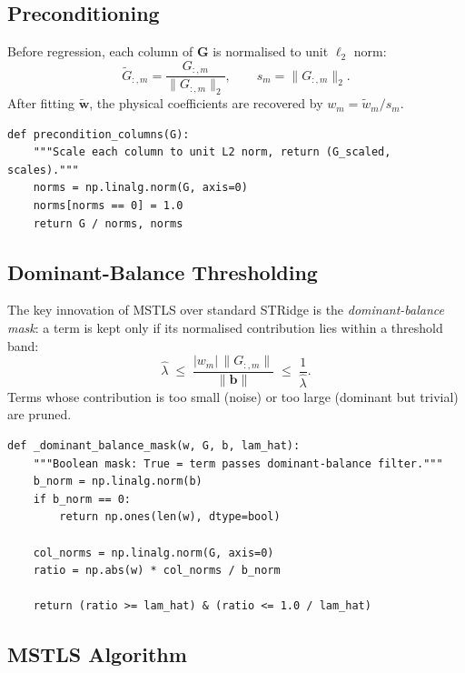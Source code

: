 \documentclass[11pt]{article}
\begin{document}
\subsection{Preconditioning}

Before regression, each column of $\mathbf{G}$ is normalised to unit
$\ell_2$ norm:
\begin{equation}
  \tilde{G}_{:,m} = \frac{G_{:,m}}{\|G_{:,m}\|_2},
  \qquad
  s_m = \|G_{:,m}\|_2.
\end{equation}
After fitting $\tilde{\mathbf{w}}$, the physical coefficients are
recovered by $w_m = \tilde{w}_m / s_m$.

\begin{lstlisting}[caption={regression.py --- Column preconditioning}]
def precondition_columns(G):
    """Scale each column to unit L2 norm, return (G_scaled, scales)."""
    norms = np.linalg.norm(G, axis=0)
    norms[norms == 0] = 1.0
    return G / norms, norms
\end{lstlisting}


\subsection{Dominant-Balance Thresholding}

The key innovation of MSTLS over standard STRidge is the
\emph{dominant-balance mask}: a term is kept only if its normalised
contribution lies within a threshold band:
\begin{equation}\label{eq:dominant_balance}
  \hat{\lambda} \;\le\;
  \frac{|w_m|\,\|G_{:,m}\|}{\|\mathbf{b}\|}
  \;\le\; \frac{1}{\hat{\lambda}}.
\end{equation}
Terms whose contribution is too small (noise) or too large (dominant
but trivial) are pruned.

\begin{lstlisting}[caption={regression.py --- Dominant-balance mask}]
def _dominant_balance_mask(w, G, b, lam_hat):
    """Boolean mask: True = term passes dominant-balance filter."""
    b_norm = np.linalg.norm(b)
    if b_norm == 0:
        return np.ones(len(w), dtype=bool)

    col_norms = np.linalg.norm(G, axis=0)
    ratio = np.abs(w) * col_norms / b_norm

    return (ratio >= lam_hat) & (ratio <= 1.0 / lam_hat)
\end{lstlisting}


\subsection{MSTLS Algorithm}
\end{document}
